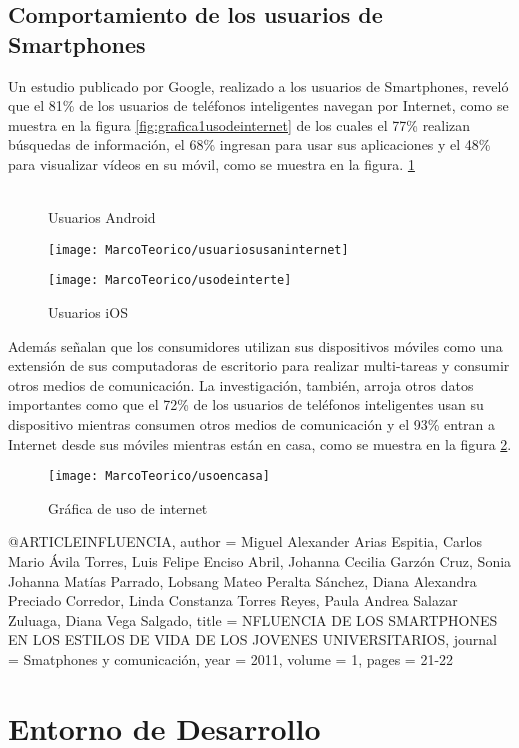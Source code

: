 	\subsection{Comportamiento de los usuarios de Smartphones}
	Un estudio publicado por Google, realizado a los usuarios de Smartphones, reveló que el 81\% de los usuarios de teléfonos inteligentes navegan por Internet,  como se muestra en la figura \ref{fig:grafica1usodeinternet} de los cuales el 77\% realizan búsquedas de información, el 68\% ingresan para usar sus aplicaciones y el 48\% para visualizar vídeos en su móvil, como se muestra en la figura. \ref{fig:grafica2usodeinternet}\\ \\
	\begin{figure}
		\centering
		\caption{Usuarios Android}
		\label{fig:grafica1usodeinternet}
		\texttt{[image: MarcoTeorico/usuariosusaninternet]}
		\caption{Usuarios iOS}
		\label{fig:grafica2usodeinternet}
		\texttt{[image: MarcoTeorico/usodeinterte]}
	\end{figure}
	Además señalan que los consumidores utilizan sus dispositivos móviles como una extensión de sus computadoras de escritorio para realizar multi-tareas y consumir otros medios de comunicación. La investigación, también, arroja otros datos importantes como que el 72\% de los usuarios de teléfonos inteligentes usan su dispositivo mientras consumen otros medios de comunicación y el 93\% entran a Internet desde sus móviles mientras están en casa, como se muestra en la figura \ref{fig:grafica3usodeinternet}.\\
	\begin{figure}
		\centering
		\caption{Gráfica de uso de internet}
		\label{fig:grafica3usodeinternet}
		\texttt{[image: MarcoTeorico/usoencasa]}
	\end{figure}
	
	@ARTICLE{INFLUENCIA,
		author = {Miguel Alexander Arias Espitia, Carlos Mario Ávila Torres, Luis Felipe Enciso
			Abril, Johanna Cecilia Garzón Cruz, Sonia Johanna Matías Parrado, Lobsang
			Mateo Peralta Sánchez, Diana Alexandra Preciado Corredor, Linda
			Constanza Torres Reyes, Paula Andrea Salazar Zuluaga, Diana Vega
			Salgado},
		title = {NFLUENCIA DE LOS SMARTPHONES EN LOS ESTILOS DE VIDA DE LOS
			JOVENES UNIVERSITARIOS},
		journal = {Smatphones y comunicación},
		year = {2011},
		volume = {1},
		pages = {21-22}
	}
	
	\section{Entorno de Desarrollo}
	
